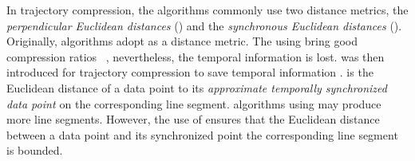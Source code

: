 %
In trajectory compression, the \lsa algorithms commonly use two distance metrics, \ie the \emph{perpendicular Euclidean distances} (\ped) and the \emph{synchronous Euclidean distances} (\sed).
Originally, \lsa algorithms adopt \ped as a distance metric.
The using \ped bring good compression ratios~ \cite{Douglas:Peucker, Hershberger:Speeding, Liu:BQS, Muckell:Compression, Chen:Trajectory, Cao:Spatio, Shi:Survey}, nevertheless, the temporal information is lost. 
%
\sed was then introduced for trajectory compression to save temporal information \cite{Meratnia:Spatiotemporal}. \sed is the Euclidean distance of a data point to its \emph{approximate temporally synchronized data point \cite{Meratnia:Spatiotemporal}} on the corresponding line segment. 
\lsa algorithms using \sed may produce more line segments. However, the use of \sed ensures that the Euclidean distance between a data point and its synchronized point \wrt the corresponding line segment is bounded. 

